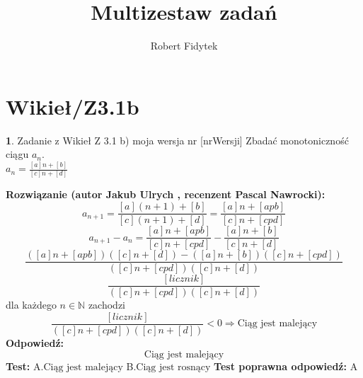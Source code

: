\documentclass[12pt, a4paper]{article}
\title{Multizestaw zadań}
\author{Robert Fidytek}
\date{}
\theoremstyle{definition} %
\newtheorem{zad}{}
\newcommand{\kategoria}[1]{\section{#1}} %
\newcommand{\zadStart}[1]{\begin{zad}#1\newline} %
\newcommand{\zadStop}{\end{zad}}   %
\newcommand{\rozwStart}[2]{\noindent \textbf{Rozwiązanie (autor #1 , recenzent #2): }\newline} %
\newcommand{\rozwStop}{\newline}                                            %
\newcommand{\odpStart}{\noindent \textbf{Odpowiedź:}\newline}    %
\newcommand{\odpStop}{\newline}                                             %
\newcommand{\testStart}{\noindent \textbf{Test:}\newline} %
\newcommand{\testStop}{\newline} %
\newcommand{\kluczStart}{\noindent \textbf{Test poprawna odpowiedź:}\newline} %
\newcommand{\kluczStop}{\newline} %
\begin{document}
\maketitle


\kategoria{Wikieł/Z3.1b}
\zadStart{Zadanie z Wikieł Z 3.1 b) moja wersja nr [nrWersji]}
Zbadać monotoniczność ciągu $a_{n}$.\\ $a_{n}=\frac{[a]n+[b]}{[c]n+[d]}$
\zadStop
\rozwStart{Jakub Ulrych}{Pascal Nawrocki}
$$a_{n+1}=\frac{[a](n+1)+[b]}{[c](n+1)+[d]}=\frac{[a]n+[apb]}{[c]n+[cpd]}$$
$$a_{n+1}-a_{n}=\frac{[a]n+[apb]}{[c]n+[cpd]}-\frac{[a]n+[b]}{[c]n+[d]}$$
$$\frac{([a]n+[apb])([c]n+[d])-([a]n+[b])([c]n+[cpd])}{([c]n+[cpd])([c]n+[d])}$$
$$\frac{[licznik]}{([c]n+[cpd])([c]n+[d])}$$
dla każdego $n\in\mathbb{N}$ zachodzi
$$\frac{[licznik]}{([c]n+[cpd])([c]n+[d])}<0\Rightarrow \text{Ciąg jest malejący}$$
\rozwStop
\odpStart
$$\text{Ciąg jest malejący}$$
\odpStop
\testStart
A.$\text{Ciąg jest malejący}$
B.$\text{Ciąg jest rosnący}$
\testStop
\kluczStart
A
\kluczStop
\end{document}
